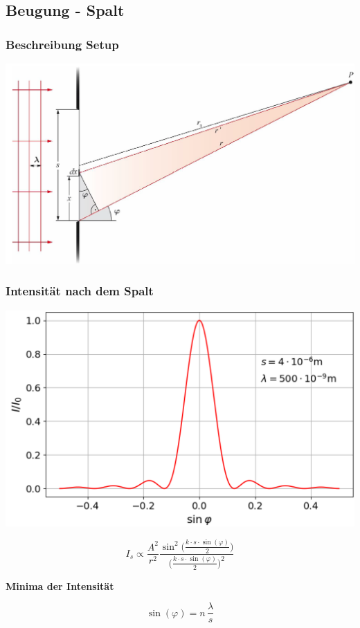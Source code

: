\subsection{Beugung - Spalt}

\subsubsection{Beschreibung Setup}
\label{Beschreibung Setup}

\includegraphics[width=0.7\linewidth]{Bilder/Wellen-Optik/beugung_spalt} 


\subsubsection{Intensität nach dem Spalt}


\begin{minipage}{0.58\linewidth}
\includegraphics[width=0.98\linewidth]{Bilder/Wellen-Optik/beugung_spalt_intensitaet} \\
\end{minipage}
\hfill
\begin{minipage}{0.4\linewidth}
$$ \boxed{ I_s \varpropto \frac{A^2}{r^2} \frac{\sin^2\Big( \frac{k \cdot s \cdot \sin(\varphi)}{2} \Big) }{\Big( \frac{k \cdot s \cdot \sin(\varphi)}{2} \Big)^2 } } $$


\textbf{Minima der Intensität} 

$$ \boxed{ \sin(\varphi) = n \, \frac{\lambda}{s}} $$ \\
\end{minipage}



